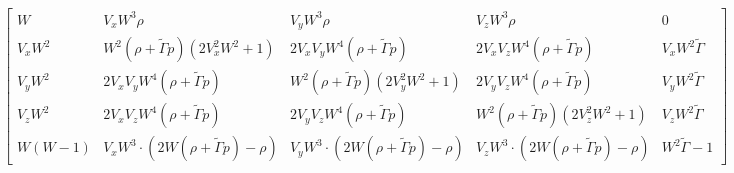 \documentclass[a4paper,landscape]{article}
\begin{document}
\begin{equation*}
  \left[\begin{matrix}W & V_{x} W^{3} \rho & V_{y} W^{3} \rho & V_{z} W^{3} \rho & 0\\V_{x} W^{2} & W^{2} \left(\rho + \widetilde{\Gamma} p\right) \left(2 V_{x}^{2} W^{2} + 1\right) & 2 V_{x} V_{y} W^{4} \left(\rho + \widetilde{\Gamma} p\right) & 2 V_{x} V_{z} W^{4} \left(\rho + \widetilde{\Gamma} p\right) & V_{x} W^{2} \widetilde{\Gamma}\\V_{y} W^{2} & 2 V_{x} V_{y} W^{4} \left(\rho + \widetilde{\Gamma} p\right) & W^{2} \left(\rho + \widetilde{\Gamma} p\right) \left(2 V_{y}^{2} W^{2} + 1\right) & 2 V_{y} V_{z} W^{4} \left(\rho + \widetilde{\Gamma} p\right) & V_{y} W^{2} \widetilde{\Gamma}\\V_{z} W^{2} & 2 V_{x} V_{z} W^{4} \left(\rho + \widetilde{\Gamma} p\right) & 2 V_{y} V_{z} W^{4} \left(\rho + \widetilde{\Gamma} p\right) & W^{2} \left(\rho + \widetilde{\Gamma} p\right) \left(2 V_{z}^{2} W^{2} + 1\right) & V_{z} W^{2} \widetilde{\Gamma}\\W \left(W - 1\right) & V_{x} W^{3} \cdot \left(2 W \left(\rho + \widetilde{\Gamma} p\right) - \rho\right) & V_{y} W^{3} \cdot \left(2 W \left(\rho + \widetilde{\Gamma} p\right) - \rho\right) & V_{z} W^{3} \cdot \left(2 W \left(\rho + \widetilde{\Gamma} p\right) - \rho\right) & W^{2} \widetilde{\Gamma} - 1\end{matrix}\right]
\end{equation*}
\end{document}

